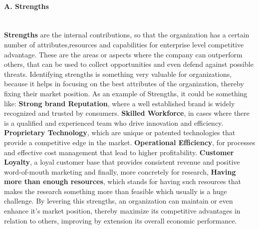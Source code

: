 \paragraph{A. Strengths}\mbox{}\\
\textbf{Strengths} are the internal contributions, so that the organization has a certain number of attributes,resources and capabilities for enterprise level competitive advantage. These are the areas or aspects where the company can outperform others, that can be used to collect opportunities and even defend against possible threats. Identifying strengths is something very valuable for organizations, because it helps in focusing on the best attributes of the organization, thereby fixing their market position.
As an example of Strengths, it could be something like: \textbf{Strong brand Reputation}, where a well established brand is widely recognized and trusted by consumers. \textbf{Skilled Workforce}, in cases where there is a qualified and experienced team who drive innovation and efficiency. \textbf{Proprietary Technology}, which are unique or patented technologies that provide a competitive edge in the market. \textbf{Operational Efficiency}, for processes and effective cost management that lead to higher profitability. \textbf{Customer Loyalty}, a loyal customer base that provides consistent revenue and positive word-of-mouth marketing and finally, more concretely for research, \textbf{Having more than enough resources}, which stands for having such resources that makes the research something more than feasible which usually is a huge challenge.
By levering this strengths, an organization can maintain or even enhance it's market position, thereby maximize its competitive advantages in relation to others, improving by extension its overall economic performance.

